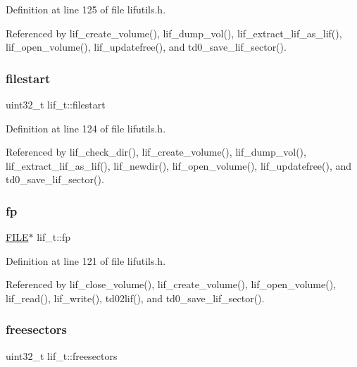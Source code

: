Definition at line 125 of file lifutils.\+h.



Referenced by lif\+\_\+create\+\_\+volume(), lif\+\_\+dump\+\_\+vol(), lif\+\_\+extract\+\_\+lif\+\_\+as\+\_\+lif(), lif\+\_\+open\+\_\+volume(), lif\+\_\+updatefree(), and td0\+\_\+save\+\_\+lif\+\_\+sector().

\mbox{\label{structlif__t_a3c1bcc66b694d07ebc304ef7cb66b4ef}} 
\subsubsection{\texorpdfstring{filestart}{filestart}}
{\footnotesize\ttfamily uint32\+\_\+t lif\+\_\+t\+::filestart}



Definition at line 124 of file lifutils.\+h.



Referenced by lif\+\_\+check\+\_\+dir(), lif\+\_\+create\+\_\+volume(), lif\+\_\+dump\+\_\+vol(), lif\+\_\+extract\+\_\+lif\+\_\+as\+\_\+lif(), lif\+\_\+newdir(), lif\+\_\+open\+\_\+volume(), lif\+\_\+updatefree(), and td0\+\_\+save\+\_\+lif\+\_\+sector().

\mbox{\label{structlif__t_ad679ba16ca21371a649981a4cca9e64c}} 
\subsubsection{\texorpdfstring{fp}{fp}}
{\footnotesize\ttfamily \hyperlink{posix_8h_aed4dabeb9f7c518ded42f930a04abce8}{F\+I\+LE}$\ast$ lif\+\_\+t\+::fp}



Definition at line 121 of file lifutils.\+h.



Referenced by lif\+\_\+close\+\_\+volume(), lif\+\_\+create\+\_\+volume(), lif\+\_\+open\+\_\+volume(), lif\+\_\+read(), lif\+\_\+write(), td02lif(), and td0\+\_\+save\+\_\+lif\+\_\+sector().

\mbox{\label{structlif__t_a1fc11461eb5643d84e229772f7623152}} 
\subsubsection{\texorpdfstring{freesectors}{freesectors}}
{\footnotesize\ttfamily uint32\+\_\+t lif\+\_\+t\+::freesectors}



